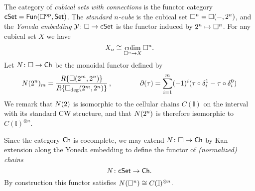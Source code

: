 The category of \textit{cubical sets with connections} is the functor category $\mathsf{cSet} = \mathsf{Fun}(\square^{\mathrm{op}}, \mathsf{Set})$.
The \textit{standard $n$-cube} is the cubical set $\square^n = \square(-, 2^n)$, and the \textit{Yoneda embedding} $\mathcal{Y} \colon \square \to \mathsf{cSet}$ is the functor induced by $2^n \mapsto \square^n$.
For any cubical set $X$ we have
\begin{equation*}
X_n \cong \operatorname*{colim}_{\square^n \to X} \square^n.
\end{equation*}
Let $N \colon \square \to \mathsf{Ch}$ be the monoidal functor defined by
\begin{equation*}
N(2^n)_m =
\frac{R\{\square(2^m, 2^n)\}}{R\{\square_{\deg}(2^m, 2^n)\}}\,,
\qquad \qquad
\partial (\tau) = \sum_{i=1}^m (-1)^i (\tau \circ \delta^1_i - \tau \circ \delta^0_i)
\end{equation*}
We remark that $N(2)$ is isomorphic to the cellular chains $C(\mathbb I)$ on the interval with its standard CW structure, and that $N(2^n)$ is therefore isomorphic to $C(\mathbb I)^{\otimes n}$. 

Since the category $\mathsf{Ch}$ is cocomplete, we may extend $N \colon \square \to \mathsf{Ch}$ by Kan extension along the Yoneda embedding to define the functor of \textit{(normalized) chains} $$N \colon \mathsf{cSet} \to \mathsf{Ch}.$$
By construction this functor satisfies $N(\square^n) \cong C(\mathbb I)^{\otimes n}$.

